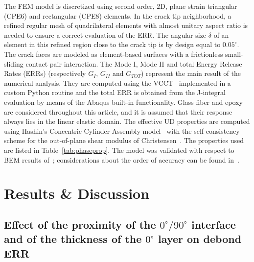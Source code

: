 \documentclass[review]{elsarticle}
\begin{document}
The FEM model is discretized using second order, 2D, plane strain triangular (CPE6) and rectangular (CPE8) elements. In the crack tip neighborhood, a refined regular mesh of quadrilateral elements with almost unitary aspect ratio is needed to ensure a correct evaluation of the ERR. The angular size $\delta$ of an element in this refined region close to the crack tip is by design equal to $0.05^{\circ}$. The crack faces are modeled as element-based surfaces with a frictionless small-sliding contact pair interaction. The Mode I, Mode II and total Energy Release Rates (ERRs) (respectively $G_{I}$, $G_{II}$ and $G_{TOT}$) represent the main result of the numerical analysis. They are computed using the VCCT~\cite{Krueger2004} implemented in a custom Python routine and the total ERR is obtained from the J-integral~\cite{Rice1968} evaluation by means of the Abaqus built-in functionality. Glass fiber and epoxy are considered throughout this article, and it is assumed that their response always lies in the linear elastic domain. The effective UD properties are computed using Hashin's Concentric Cylinder Assembly model~\cite{Hashin1983} with the self-consistency scheme for the out-of-plane shear modulus of Christensen~\cite{Christensen1979}. The properties used are listed in Table~\ref{tab:phaseprop}. The model was validated with respect to BEM results of~\cite{Paris2007,Sandino2016}; considerations about the order of accuracy can be found in~\cite{DiStasio2019}.


\section{Results \& Discussion}

\subsection{Effect of the proximity of the $0^{\circ}/90^{\circ}$ interface and of the thickness of the $0^{\circ}$ layer on debond ERR}\label{subsec:thickness}
\end{document}
